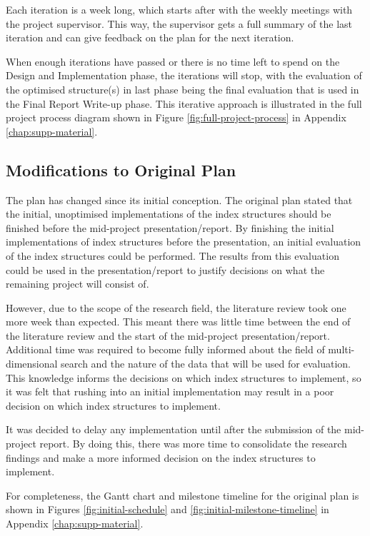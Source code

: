Each iteration is a week long, which starts after with the weekly meetings with the project supervisor. This way, the supervisor gets a full summary of the last iteration and can give feedback on the plan for the next iteration.

When enough iterations have passed or there is no time left to spend on the Design and Implementation phase, the iterations will stop, with the evaluation of the optimised structure(s) in last phase being the final evaluation that is used in the Final Report Write-up phase. This iterative approach is illustrated in the full project process diagram shown in Figure \ref{fig:full-project-process} in Appendix \ref{chap:supp-material}.

\subsection{Modifications to Original Plan}

The plan has changed since its initial conception. The original plan stated that the initial, unoptimised implementations of the index structures should be finished before the mid-project presentation/report. By finishing the initial implementations of index structures before the presentation, an initial evaluation of the index structures could be performed. The results from this evaluation could be used in the presentation/report to justify decisions on what the remaining project will consist of.

However, due to the scope of the research field, the literature review took one more week than expected. This meant there was little time between the end of the literature review and the start of the mid-project presentation/report. Additional time was required to become fully informed about the field of multi-dimensional search and the nature of the data that will be used for evaluation. This knowledge informs the decisions on which index structures to implement, so it was felt that rushing into an initial implementation may result in a poor decision on which index structures to implement.

It was decided to delay any implementation until after the submission of the mid-project report. By doing this, there was more time to consolidate the research findings and make a more informed decision on the index structures to implement.

For completeness, the Gantt chart and milestone timeline for the original plan is shown in Figures \ref{fig:initial-schedule} and \ref{fig:initial-milestone-timeline} in Appendix \ref{chap:supp-material}.

